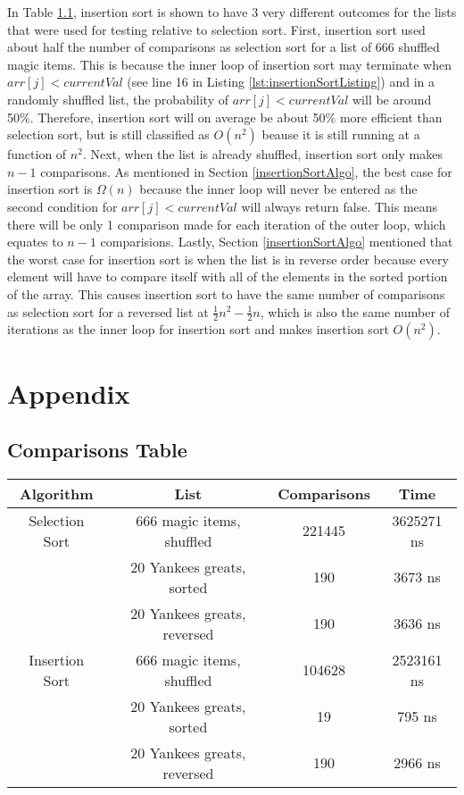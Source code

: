 \documentclass[letterpaper, 10pt,DIV=13]{scrartcl}
\numberwithin{equation}{section} %
\numberwithin{figure}{section} %
\numberwithin{table}{section} %
\begin{document}
In Table \ref{comparisonsTable}, insertion sort is shown to have 3 very different outcomes for the lists that were used for testing relative to selection sort. First, insertion sort used about half the number of comparisons as selection sort for a list of 666 shuffled magic items. This is because the inner loop of insertion sort may terminate when $arr[j] < currentVal$ (see line 16 in Listing \ref{lst:insertionSortListing}) and in a randomly shuffled list, the probability of $arr[j] < currentVal$ will be around 50\%. Therefore, insertion sort will on average be about 50\% more efficient than selection sort, but is still classified as $O(n^2)$ beause it is still running at a function of $n^2$. Next, when the list is already shuffled, insertion sort only makes $n-1$ comparisons. As mentioned in Section \ref{insertionSortAlgo}, the best case for insertion sort is $\Omega(n)$ because the inner loop will never be entered as the second condition for $arr[j] < currentVal$ will always return false. This means there will be only 1 comparison made for each iteration of the outer loop, which equates to $n - 1$ comparisions. Lastly, Section \ref{insertionSortAlgo} mentioned that the worst case for insertion sort is when the list is in reverse order because every element will have to compare itself with all of the elements in the sorted portion of the array. This causes insertion sort to have the same number of comparisons as selection sort for a reversed list at $\frac{1}{2}n^2 - \frac{1}{2}n$, which is also the same number of iterations as the inner loop for insertion sort and makes insertion sort $O(n^2)$.

\section{Appendix}
\subsection{Comparisons Table}\label{comparisonsTable}
\begin{center}
  \begin{tabular}{|c|c|c|c|}
    \hline
    Algorithm & List & Comparisons & Time \\
    \hline
    Selection Sort & 666 magic items, shuffled & 221445 & 3625271 ns \\
    \hline
    & 20 Yankees greats, sorted & 190 & 3673 ns \\
    \hline
    & 20 Yankees greats, reversed & 190 & 3636 ns \\
    \hline
    Insertion Sort & 666 magic items, shuffled & 104628 & 2523161 ns \\
    \hline
    & 20 Yankees greats, sorted & 19 & 795 ns \\
    \hline
    & 20 Yankees greats, reversed & 190 & 2966 ns \\
    \hline
  \end{tabular}
\end{center}
\end{document}
